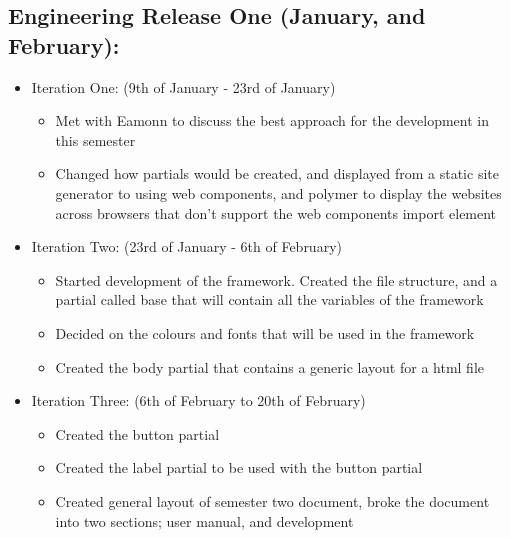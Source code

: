 \subsection*{Engineering Release One (January, and February):}
\begin{itemize}
	\item Iteration One: (9th of January - 23rd of January)\begin{itemize} 
	\item Met with Eamonn to discuss the best approach for the development in this semester
	\item Changed how partials would be created, and displayed from a static site generator to using web components, and polymer to display the websites across browsers that don't support the web components import element
	\end{itemize}
	\item Iteration Two: (23rd of January - 6th of February) \begin{itemize}
	\item Started development of the framework. Created the file structure, and a partial called base that will contain all the variables of the framework
	\item Decided on the colours and fonts that will be used in the framework
	\item Created the body partial that contains a generic layout for a html file
	\end{itemize}
	\item Iteration Three: (6th of February to 20th of February)\begin{itemize}
	\item Created the button partial
	\item Created the label partial to be used with the button partial
	\item Created general layout of semester two document, broke the document into two sections; user manual, and development
	\end{itemize}

\end{itemize}
